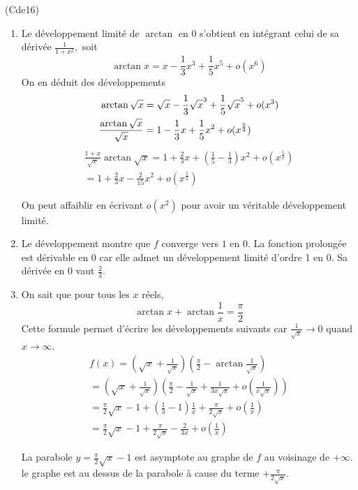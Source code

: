 \begin{tiny}(Cde16)\end{tiny} 
\begin{enumerate}
\item  Le d\'{e}veloppement limit\'{e} de $\arctan $ en 0 s'obtient en int\'{e}grant celui de sa d\'{e}riv\'{e}e $\frac{1}{1+x^{2}},$ soit
\begin{displaymath}
\arctan x=x-\frac{1}{3}x^{3}+\frac{1}{5}x^{5}+o(x^{6}) 
\end{displaymath}
On en d\'{e}duit des d\'{e}veloppements 
\begin{align*}
\arctan \sqrt{x} &= \sqrt{x}-\frac{1}{3}\sqrt{x}^{3}+\frac{1}{5}\sqrt{x}%
^{5}+o(x^{3}) \\
\frac{\arctan \sqrt{x}}{\sqrt{x}} &= 1-\frac{1}{3}x+\frac{1}{5}x^{2}+o(x^{%
\frac{5}{2}})
\end{align*}
\begin{multline*}
 \frac{1+x}{\sqrt{x}}\arctan \sqrt{x} 
= 1+\frac{2}{3}x+(\frac{1}{5}-\frac{1}{3})x^{2}+o(x^{\frac{5}{2}}) \\
= 1+\frac{2}{3}x-\frac{2}{15}x^{2}+o(x^{\frac{5}{2}})
\end{multline*}

On peut affaiblir en écrivant $o(x^2)$ pour avoir un véritable développement limité.
\item  Le d\'{e}veloppement montre que $f$ converge vers $1$ en $0$. La fonction prolong\'{e}e est d\'{e}rivable en $0$ car elle admet un d\'{e}veloppement limit\'{e} d'ordre 1 en $0$. Sa d\'{e}riv\'{e}e en $0$ vaut $\frac{2}{3}$.

\item  On sait que pour tous les $x$ r\'{e}els, 
\[
\arctan x+\arctan \frac{1}{x}=\frac{\pi }{2}
\]
Cette formule permet d'\'{e}crire les d\'{e}veloppements suivants car $\frac{1}{\sqrt{x}}\rightarrow 0$ quand $x\rightarrow \infty $.
\begin{multline*}
f(x) =(\sqrt{x}+\frac{1}{\sqrt{x}})(\frac{\pi }{2}-\arctan \frac{1}{\sqrt{x}}) \\
 = (\sqrt{x}+\frac{1}{\sqrt{x}})(\frac{\pi }{2}-\frac{1}{\sqrt{x}}+\frac{1}{3x\sqrt{x}}+o(\frac{1}{x\sqrt{x}})) \\
 = \frac{\pi }{2}\sqrt{x}-1+(\frac{1}{3}-1)\frac{1}{x}+\frac{\pi }{2\sqrt{x}}+o(\frac{1}{x}) \\
 = \frac{\pi }{2}\sqrt{x}-1+\frac{\pi }{2\sqrt{x}}-\frac{2}{3x}+o(\frac{1}{x})
\end{multline*}

La parabole $y=\frac{\pi }{2}\sqrt{x}-1$ est asymptote au graphe de $f$ au voisinage de $+\infty $. le graphe est au dessus de la parabole \`{a} cause du terme $+\frac{\pi }{2\sqrt{x}}$.
\end{enumerate}

